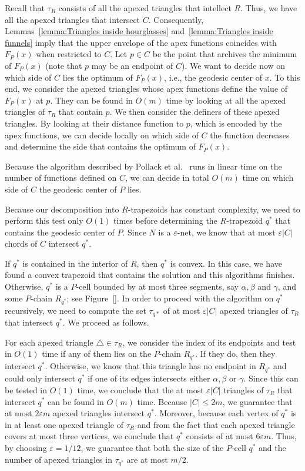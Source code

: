\documentclass[a4paper,UKenglish]{lipics}
\newcommand{\F}[2]{\ensuremath{F_{\scriptscriptstyle #1}(#2)}}
\begin{document}
Recall that $\tau_R$ consists of all the apexed triangles that intellect $R$. 
Thus, we have all the apexed triangles that intersect $C$. Consequently, Lemmas~\ref{lemma:Triangles inside hourglasses} and~\ref{lemma:Triangles inside funnels} imply that the upper envelope of the apex functions coincides with $\F{P}{x}$ when restricted to $C$.
Let $p\in C$ be the point that archives the minimum of $\F{P}{x}$ (note that $p$ may be an endpoint of $C$). 
We want to decide now on which side of $C$ lies the optimum of $\F{P}{x}$, i.e., the geodesic center of $x$. 
To this end, we consider the apexed triangles whose apex functions define the value of $\F{P}{x}$ at $p$. 
They can be found in $O(m)$ time by looking at all the apexed triangles of $\tau_R$ that contain $p$. 
We then consider the definers of these apexed triangles. By looking at their distance function to $p$, which is encoded by the apex functions, we can decide locally on which side of $C$ the function decreases and determine the side that contains the optimum of $\F{P}{x}$.

Because the algorithm described by Pollack et al.~\cite[Section~3]{pollackComputingCenter} runs in linear time on the number of functions defined on $C$, we can decide in total $O(m)$ time on which side of $C$ the geodesic center of $P$ lies. 

Because our decomposition into $R$-trapezoids has constant complexity, we need to perform this test only $O(1)$ times before determining the $R$-trapezoid $q^*$ that contains the geodesic center of $P$. 
Since $N$ is a $\varepsilon$-net, we know that at most $\varepsilon |C|$ chords of $C$ intersect $q^*$.

If $q^*$ is contained in the interior of $R$, then $q^*$ is convex. In this case, we have found a convex trapezoid that contains the solution and this algorithms finishes. Otherwise, $q^*$ is a $P$-cell bounded by at most three segments, say $\alpha, \beta$ and $\gamma$, and some $P$-chain $R_{q^*}$; see Figure~\ref{}. 
In order to proceed with the algorithm on  $q^*$ recursively, we need to compute the set $\tau_{q*}$ of at most $\varepsilon |C|$ apexed triangles of $\tau_R$ that intersect $q^*$. We proceed as follows.

For each apexed triangle $\triangle\in \tau_R$, we consider the index of its endpoints and test in $O(1)$ time if any of them lies on the $P$-chain $R_{q^*}$. If they do, then they intersect $q^*$. Otherwise, we know that this triangle has no endpoint in $R_{q^*}$ and could only intersect $q^*$ if one of its edges intersects either $\alpha, \beta$ or $\gamma$. Since this can be tested in $O(1)$ time, we conclude that the at most $\varepsilon |C|$ triangles of $\tau_R$ that intersect $q^*$ can be found in $O(m)$ time.
Because $|C| \leq 2m$, we guarantee that at most $2\varepsilon m$ apexed triangles intersect $q^*$. 
Moreover, because each vertex of $q^*$ is in at least one apexed triangle of $\tau_R$ and from the fact that each apexed triangle covers at most three vertices, we conclude that $q^*$ consists of at most $6 \varepsilon m$.
Thus, by choosing $\varepsilon = 1/12$, we guarantee that both the size of the $P$-cell $q^*$ and the number of apexed triangles in $\tau_{q^*}$ are at most $m/2$.
\end{document}
